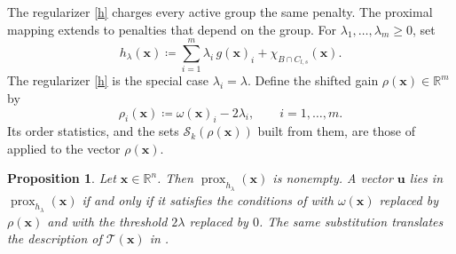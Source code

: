 \documentclass[11pt,a4paper]{article}
\theoremstyle{plain}
\newtheorem{proposition}{Proposition}
\theoremstyle{definition}
\theoremstyle{remark}
\newcommand*\R{\mathbb{R}}
\newcommand*\x{\mathbf{x}}
\newcommand*\U{\mathbf{u}}
\newcommand*\prox{\operatorname{prox}}
\begin{document}
The regularizer \eqref{h} charges every active group the same penalty.
The proximal mapping extends to penalties that depend on the group.
For
\(\lambda_1,\ldots,\lambda_m\geq 0\), set
\begin{equation}
  \label{hlambda}
  h_{\lambda}(\x)\coloneqq\sum_{i=1}^m \lambda_i\, g(\x)_i+\chi_{B\cap C_{l,s}}(\x).
\end{equation}
The regularizer \eqref{h} is the special case \(\lambda_i=\lambda\).
Define the
shifted gain \(\rho(\x)\in\R^m\) by
\begin{equation}
  \label{rho}
  \rho_i(\x)\coloneqq\omega(\x)_i-2\lambda_i, \qquad i=1,\ldots,m.
\end{equation}
Its order statistics, and the sets \(\mathcal{S}_k(\rho(\x))\) built from them, are those of  applied to the vector \(\rho(\x)\).

\begin{proposition}
  \label{prop:weights}
  Let \(\x\in\R^n\).
  Then \(\prox_{h_{\lambda}}(\x)\) is nonempty.
  A vector \(\U\) lies in \(\prox_{h_{\lambda}}(\x)\) if and only if it satisfies the conditions of  with \(\omega(\x)\) replaced by \(\rho(\x)\) and with the threshold \(2\lambda\) replaced by \(0\).
  The same substitution translates the description of \(\mathcal{T}(\x)\) in .
\end{proposition}
\end{document}
